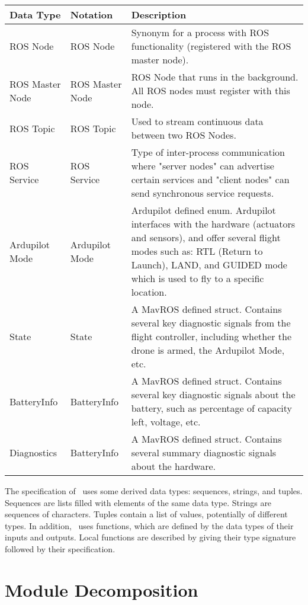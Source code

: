 \documentclass[12pt, titlepage]{article}
\begin{document}
\begin{center}
\renewcommand{\arraystretch}{1.2}
\noindent 
\begin{tabular}{p{2.5cm} p{2.5cm} p{8cm}}
\toprule 
\textbf{Data Type} & \textbf{Notation} & \textbf{Description}\\ 
\midrule 
ROS Node & ROS Node & Synonym for a process with ROS functionality (registered with the ROS master node). \\
ROS Master Node & ROS Master Node & ROS Node that runs in the background. All ROS nodes must register with this node. \\
ROS Topic & ROS Topic & Used to stream continuous data between two ROS Nodes. \\
ROS Service & ROS Service & Type of inter-process communication where "server nodes" can advertise certain services and "client nodes" can send synchronous service requests.  \\
Ardupilot Mode & Ardupilot Mode & Ardupilot defined enum. Ardupilot interfaces with the hardware (actuators and sensors), and offer several flight modes such as: RTL (Return to Launch), LAND, and GUIDED mode which is used to fly to a specific location.  \\
State & State & A MavROS defined struct. Contains several key diagnostic signals from the flight controller, including whether the drone is armed, the Ardupilot Mode, etc.  \\
BatteryInfo & BatteryInfo & A MavROS defined struct. Contains several key diagnostic signals about the battery, such as percentage of capacity left, voltage, etc.  \\
Diagnostics & BatteryInfo & A MavROS defined struct. Contains several summary diagnostic signals about the hardware.  \\
\end{tabular} 
\end{center}

\noindent
The specification of \progname \ uses some derived data types: sequences, strings, and
tuples. Sequences are lists filled with elements of the same data type. Strings
are sequences of characters. Tuples contain a list of values, potentially of
different types. In addition, \progname \ uses functions, which
are defined by the data types of their inputs and outputs. Local functions are
described by giving their type signature followed by their specification.

\section{Module Decomposition}
\end{document}
